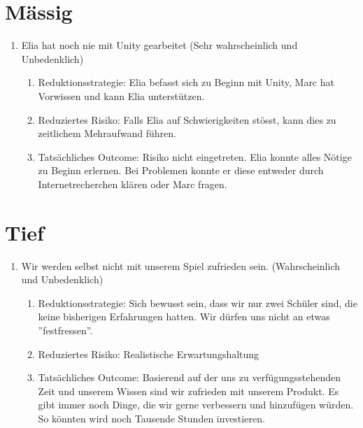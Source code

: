 \begin{enumerate}
\end{enumerate}

\section{Mässig}
\begin{enumerate}
    \item Elia hat noch nie mit Unity gearbeitet (Sehr wahrscheinlich und Unbedenklich)
    \begin{enumerate}
        \item Reduktionsstrategie: Elia befasst sich zu Beginn mit Unity, Marc hat Vorwissen und kann Elia unterstützen.
        \item Reduziertes Risiko: Falls Elia auf Schwierigkeiten stösst, kann dies zu zeitlichem Mehraufwand führen.
        \item Tatsächliches Outcome: Risiko nicht eingetreten. Elia konnte alles Nötige zu Beginn erlernen. Bei Problemen konnte er diese entweder durch Internetrecherchen klären oder Marc fragen. 
    \end{enumerate}
\end{enumerate}

\newpage
\section{Tief}
\begin{enumerate}
    \item Wir werden selbst nicht mit unserem Spiel zufrieden sein. (Wahrscheinlich und Unbedenklich)
    \begin{enumerate}
        \item Reduktionsstrategie: Sich bewusst sein, dass wir nur zwei Schüler sind, die keine bisherigen Erfahrungen hatten. Wir dürfen uns nicht an etwas ''festfressen''.
        \item Reduziertes Risiko: Realistische Erwartungshaltung
        \item Tatsächliches Outcome: Basierend auf der uns zu verfügungsstehenden Zeit und unserem Wissen sind wir zufrieden mit unserem Produkt. Es gibt immer noch Dinge, die wir gerne verbessern und hinzufügen würden. So könnten wird noch Tausende Stunden investieren.
    \end{enumerate}
\end{enumerate}